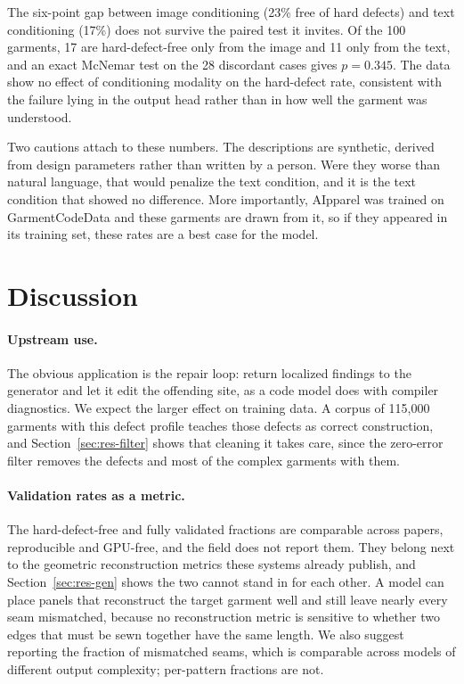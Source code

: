 \documentclass[10pt,twocolumn]{article}
\begin{document}
The six-point gap between image conditioning (23\% free of hard defects) and
text conditioning (17\%) does not survive the paired test it invites. Of the 100
garments, 17 are hard-defect-free only from the image and 11 only from the
text, and an exact McNemar test on the 28 discordant cases gives $p = 0.345$.
The data show no effect of conditioning modality on the hard-defect rate,
consistent with the failure lying in the output head rather than in how well
the garment was understood.

Two cautions attach to these numbers. The descriptions are synthetic, derived
from design parameters rather than written by a person. Were they worse than
natural language, that would penalize the text condition, and it is the text
condition that showed no difference. More importantly, AIpparel was trained on
GarmentCodeData and these garments are drawn from it, so if they appeared in its
training set, these rates are a best case for the model.


\section{Discussion}

\paragraph{Upstream use.} The obvious application is the repair loop: return
localized findings to the generator and let it edit the offending site, as a
code model does with compiler diagnostics. We expect the larger effect on
training data. A corpus of 115{,}000 garments with this defect profile teaches
those defects as correct construction, and Section~\ref{sec:res-filter} shows
that cleaning it takes care, since the zero-error filter removes the defects
and most of the complex garments with them.

\paragraph{Validation rates as a metric.} The hard-defect-free and fully
validated fractions are comparable across papers, reproducible and GPU-free,
and the field does not report them. They belong next to the geometric
reconstruction metrics these systems already publish, and
Section~\ref{sec:res-gen} shows the two cannot stand in for each other. A model
can place panels that reconstruct the target garment well and still leave
nearly every seam mismatched, because no reconstruction metric is sensitive to
whether two edges that must be sewn together have the same length. We also
suggest reporting the fraction of mismatched seams, which is comparable across
models of different output complexity; per-pattern fractions are not.
\end{document}
